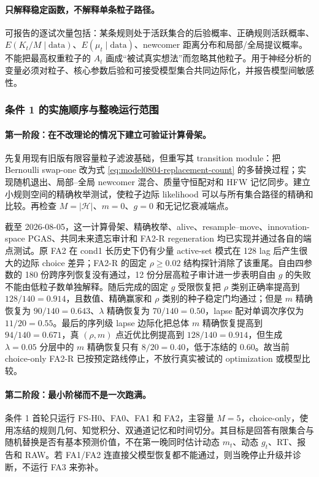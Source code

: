 \paragraph{只解释稳定函数，不解释单条粒子路径。}
可报告的逐试次量包括：某条规则处于活跃集合的后验概率、正确规则活跃概率、$E(K_t/M\mid\text{data})$、$E(\mu_t\mid\text{data})$、newcomer 距离分布和局部/全局提议概率。不能把最高权重粒子的 $A_t$ 画成“被试真实想法”而忽略其他粒子。用于神经分析的变量必须对粒子、核心参数后验和可接受模型集合共同边际化，并报告模型间敏感性。


\subsubsection{条件 1 的实施顺序与整晚运行范围}

\paragraph{第一阶段：在不改理论的情况下建立可验证计算骨架。}
先复用现有旧版有限容量粒子滤波基础，但重写其 transition module：把 Bernoulli swap-one 改为式 \ref{eq:model0804-replacement-count} 的多替换过程；实现随机退出、局部--全局 newcomer 混合、质量守恒配对和 HFW 记忆同步。建立小规则空间的精确枚举测试，使粒子边际 likelihood 可以与所有集合路径的精确和比较。再检查 $M=|\mathcal H|$、$m=0$、$g=0$ 和无记忆衰减端点。

截至 2026-08-05，这一计算骨架、精确枚举、alive、resample--move、innovation-space PGAS、共同未来遗忘审计和 FA2-R regeneration 均已实现并通过各自的端点测试。原 FA2 在 cond1 长历史下仍有少量 active-set 模式在 128 lag 后产生很大的边际 choice 差异；FA2-R 的固定 $\rho\geq0.02$ 结构探针消除了该重尾。自由四参数的 180 份跨序列恢复没有通过，12 份分层高粒子审计进一步表明自由 $g$ 的失败不能由低粒子数单独解释。随后完成的固定 $g$ 受限恢复把 $\rho$ 类别正确率提高到 $128/140=0.914$，且数值、精确赢家和 $\rho$ 类别的种子稳定门均通过；但是 $m$ 精确恢复为 $90/140=0.643$、$\lambda$ 精确恢复为 $70/140=0.50$，lapse 配对单调次序仅为 $11/20=0.55$。最后的序列级 lapse 边际化把总体 $m$ 精确恢复提高到 $94/140=0.671$，真 $(\rho,m)$ 点近优比例提高到 $128/140=0.914$，但生成 $\lambda=0.05$ 分层中的 $m$ 精确恢复只有 $8/20=0.40$，低于冻结的 $0.60$。故当前 choice-only FA2-R 已按预定路线停止，不放行真实被试的 optimization 或模型比较。

\paragraph{第二阶段：最小阶梯而不是一次跑满。}
条件 1 首轮只运行 FS-H0、FA0、FA1 和 FA2，主容量 $M=5$，choice-only，使用冻结的规则几何、知觉积分、双通道记忆和时间切分。其目标是回答有限集合与随机替换是否有基本预测价值，不在第一晚同时估计动态 $m_t$、动态 $g_t$、RT、报告和 RAW。若 FA1/FA2 连直接父模型恢复都不能通过，则当晚停止升级并诊断，不运行 FA3 来弥补。

